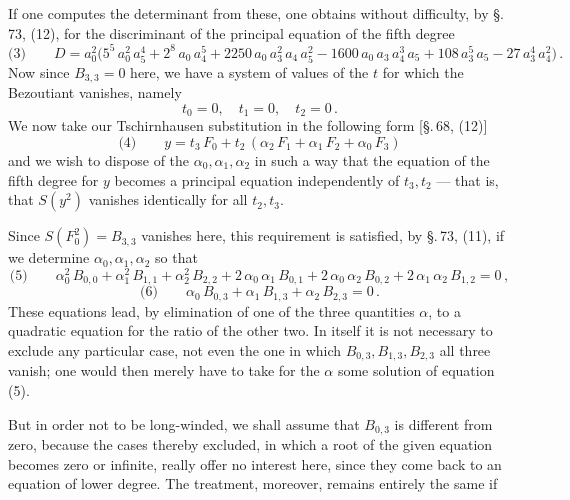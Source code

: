 

If one computes the determinant from these, one obtains
without difficulty, by \S.\,73, (12), for the discriminant
of the principal equation of the fifth degree
\[
\text{(3)} \qquad D = a_0^2\bigl(5^5\,a_0^2\,a_5^4 + 2^8\,a_0\,a_4^5 + 2250\,a_0\,a_3^2\,a_4\,a_5^2
- 1600\,a_0\,a_3\,a_4^3\,a_5 + 108\,a_3^5\,a_5 - 27\,a_3^4\,a_4^2\bigr)\,.
\]
Now since $B_{3,3} = 0$ here, we have a system of values
of the $t$ for which the Bezoutiant vanishes, namely
\[
t_0 = 0, \quad t_1 = 0, \quad t_2 = 0\,.
\]
We now take our Tschirnhausen substitution in the following form [\S.\,68, (12)]
\[
\text{(4)} \qquad y = t_3\,F_0 + t_2\,(\alpha_2\,F_1 + \alpha_1\,F_2 + \alpha_0\,F_3)
\]
and we wish to dispose of the $\alpha_0, \alpha_1, \alpha_2$ in such a way that the equation
of the fifth degree for $y$ becomes a principal equation independently of $t_3, t_2$ --- that is, that $S(y^2)$ vanishes identically for all $t_2, t_3$.

\indent Since $S(F_0^2) = B_{3,3}$ vanishes here, this
requirement is satisfied, by \S.\,73, (11), if we determine $\alpha_0, \alpha_1, \alpha_2$ so that
\[
\text{(5)} \qquad \alpha_0^2\,B_{0,0} + \alpha_1^2\,B_{1,1} + \alpha_2^2\,B_{2,2}
+ 2\,\alpha_0\,\alpha_1\,B_{0,1} + 2\,\alpha_0\,\alpha_2\,B_{0,2} + 2\,\alpha_1\,\alpha_2\,B_{1,2} = 0\,,
\]
\[
\text{(6)} \qquad \alpha_0\,B_{0,3} + \alpha_1\,B_{1,3} + \alpha_2\,B_{2,3} = 0\,.
\]
These equations lead, by elimination of one of the
three quantities $\alpha$, to a quadratic equation for the ratio of the other two. In itself it is not necessary
to exclude any particular case, not even the one in which
$B_{0,3}, B_{1,3}, B_{2,3}$ all three vanish; one would then merely have
to take for the $\alpha$ some solution of equation (5).

\indent But in order not to be long-winded, we shall assume
that $B_{0,3}$ is different from zero, because the cases thereby excluded, in which a root of the given equation becomes zero or infinite, really offer no interest
here, since they come back to an equation of lower degree. The treatment, moreover, remains entirely the same if
